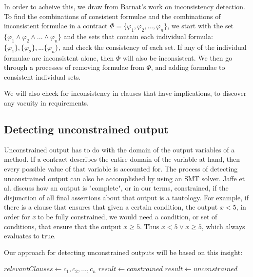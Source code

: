 \documentclass{article}
\begin{document}
In order to acheive this, we draw from Barnat's \cite{barnat2016analysing} work on inconsistency detection.
To find the combinations of consistent formulae and the combinations of inconsistent formulae in a contract
\(\Phi = \{\varphi_{1}, \varphi_{2}, ..., \varphi_{n}\}\), we start with the set \(\{\varphi_{1} \land \varphi_{2} \land ... \land \varphi_{n}\} \)
and the sets that contain each individual formula: \(\{\varphi_{1}\}, \{\varphi_{2}\}, ... \{\varphi_{n}\} \), and check
the consistency of each set. If any of the individual formulae are inconsistent alone, then \(\Phi\) will also be inconsistent.
We then go through a processes of removing formulae from \(\Phi\), and adding formulae to consistent individual sets.

We will also check for inconsistency in clauses that have implications, to discover any vacuity in requirements.

\subsection*{Detecting unconstrained output}

Unconstrained output has to do with the domain of the output variables of a method. If a contract describes the entire
domain of the variable at hand, then every possible value of that variable is accounted for. The process of detecting
unconstrained output can also be accomplished by using an SMT solver. Jaffe et al. \cite{jaffe1989completeness} discuss how
an output is "complete", or in our terms, constrained, if the disjunction of all final assertions about that output is a
tautology. For example, if there is a clause that ensures that given a certain condition, the output \(x < 5\), in order
for {\it x} to be fully constrained, we would need a condition, or set of conditions, that ensure that the output \(x \geq 5\).
Thus \(x < 5 \lor x \geq 5\), which always evaluates to true.

Our approach for detecting unconstrained outputs will be based on this insight:
\break

\begin{algorithmic}

    \State $relevantClauses \gets c_{1}, c_{2}, ..., c_{n}$ 
        \State $result \gets constrained$
    \Else
        \State $result \gets unconstrained$
    \EndIf
\EndFor

\end{algorithmic}
\end{document}
